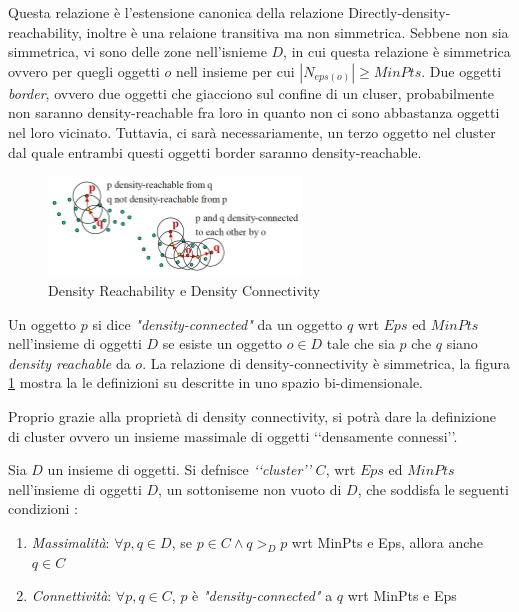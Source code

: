 \documentclass[a4paper,12pt]{report}
\begin{document}
Questa relazione è l'estensione canonica della relazione Directly-density-reachability, inoltre è una relaione transitiva ma non simmetrica. Sebbene non sia simmetrica, vi sono delle zone nell'isnieme $D$, in cui questa relazione è simmetrica ovvero  per quegli oggetti $o$ nell insieme per cui $|N_{eps(o)}| \ge MinPts$. Due oggetti \emph{border}, ovvero due oggetti che giacciono sul confine di un cluser, probabilmente non saranno density-reachable fra loro in quanto non ci sono abbastanza oggetti nel loro vicinato. Tuttavia, ci sarà necessariamente, un terzo oggetto nel cluster dal quale entrambi questi  oggetti border saranno density-reachable.
\begin{figure}
\centering
\includegraphics[width=0.6\textwidth]{density-reachable}
\caption{Density Reachability e Density Connectivity}
\label{fig:dens-reach}
\end{figure}
\begin{definizione}
\label{def:dc}
Un oggetto $p$ si dice 	\emph{"density-connected"} da un oggetto $q$ wrt $Eps$ ed $MinPts$ nell'insieme di oggetti $D$ se esiste un oggetto $o \in D$  tale che sia $p$ che $q$ siano \emph{ density reachable} da $o$. La relazione di density-connectivity è simmetrica, la figura \ref{fig:dens-reach} mostra la le definizioni su descritte in uno spazio bi-dimensionale. 
\end{definizione} 
Proprio grazie alla proprietà di density connectivity, si potrà dare la definizione di cluster ovvero un insieme massimale di oggetti \lq\lq densamente connessi\rq\rq.
\begin{definizione}[cluster]
\label{def:cluster}
Sia $D$ un insieme di oggetti.
Si defnisce \emph{\lq\lq cluster\rq\rq}  $C$,  wrt $Eps$ ed $MinPts$ nell'insieme di oggetti $D$,
un sottoniseme non vuoto di $D$, che soddisfa le seguenti condizioni :
\begin{enumerate}
\item \emph{Massimalità}: $\forall p,q\in D$, se $p \in C \land q>_{D}p$ wrt MinPts e Eps, 
allora anche $q \in C  $

\item \emph{Connettività}: $\forall p,q\in C$, $p$ è \emph{"density-connected"} a $q$  wrt MinPts e Eps

\end{enumerate}
 
\end{definizione} 
\end{document}
